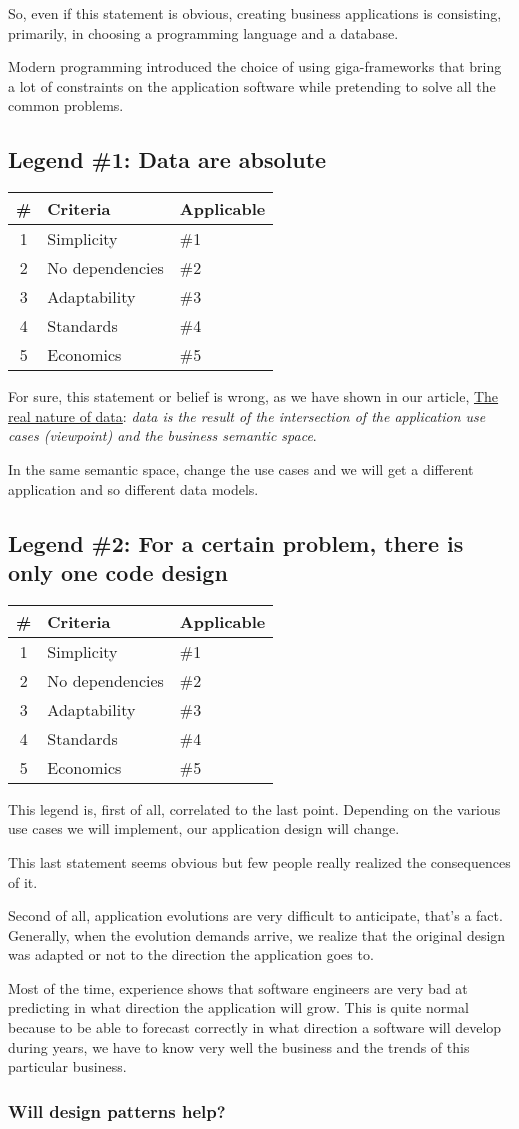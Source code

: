 \documentclass[]{article}
\newcommand{\criterias}[5]
{\begin{tabular}{|c|l|l|}
\textbf{\#} & \textbf{Criteria} & \textbf{Applicable} \\
\hline
1 & Simplicity      & \#1 \\
2 & No dependencies & \#2 \\
3 & Adaptability    & \#3 \\
4 & Standards       & \#4 \\
5 & Economics       & \#5 \\
\end{tabular}}
\begin{document}
So, even if this statement is obvious, creating business applications is consisting, primarily, in choosing a programming language and a database.

Modern programming introduced the choice of using giga-frameworks that bring a lot of constraints on the application software while pretending to solve all the common problems.

\subsection{Legend \#1: Data are absolute}

\criterias{Yes}{-}{Yes}{-}{Yes}

For sure, this statement or belief is wrong, as we have shown in our article, \href{https://orey.github.io/papers/articles/data-interop/}{The real nature of data}: \emph{data is the result of the intersection of the application use cases (viewpoint) and the business semantic space}.

In the same semantic space, change the use cases and we will get a different application and so different data models.

\subsection{Legend \#2: For a certain problem, there is only one code design}

\criterias{Yes}{-}{Yes}{-}{Yes}

This legend is, first of all, correlated to the last point. Depending on the various use cases we will implement, our application design will change.

This last statement seems obvious but few people really realized the consequences of it.

Second of all, application evolutions are very difficult to anticipate, that's a fact. Generally, when the evolution demands arrive, we realize that the original design was adapted or not to the direction the application goes to.

Most of the time, experience shows that software engineers are very bad at predicting in what direction the application will grow. This is quite normal because to be able to forecast correctly in what direction a software will develop during years, we have to know very well the business and the trends of this particular business.

\subsubsection{Will design patterns help?}
\end{document}
